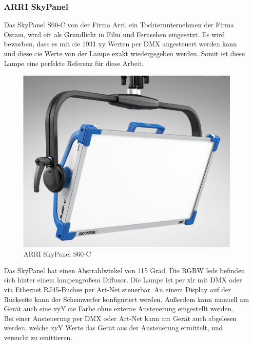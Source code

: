 \documentclass[11pt]{scrartcl}
\begin{document}
\subsubsection{ARRI SkyPanel}
Das SkyPanel S60-C von der Firma Arri, ein Tochterunternehmen der Firma Osram, wird oft als Grundlicht in Film und Fernsehen eingesetzt.
Es wird beworben, dass es mit \ac{cie} 1931 xy Werten per DMX angesteuert werden kann und diese \ac{cie} Werte von der Lampe exakt
wiedergegeben werden. Somit ist diese Lampe eine perfekte Referenz für diese Arbeit.
\begin{figure}[H]
    \begin{center}
        \includegraphics[width=.48\textwidth]{images/skypanel_s60_c.png}
    \end{center}
    \caption[ARRI SkyPanel S60-C]{ARRI SkyPanel S60-C \cite{arri}}
\end{figure}
\noindent
Das SkyPanel hat einen Abstrahlwinkel von 115 Grad. Die RGBW \ac{led}s befinden sich hinter einem lampengroßem Diffusor. Die Lampe ist per
\ac{xlr} mit DMX oder via Ethernet RJ45-Buchse per Art-Net steuerbar. An einem Display auf der Rückseite kann der Scheinwerfer
konfiguriert werden. Außerdem kann manuell am Gerät auch eine xyY \ac{cie} Farbe ohne externe Ansteuerung eingestellt werden.\\
Bei einer Ansteuerung per DMX oder Art-Net kann am Gerät auch abgelesen werden, welche xyY Werte das Gerät aus der Ansteuerung ermittelt,
und versucht zu emittieren.
\end{document}

